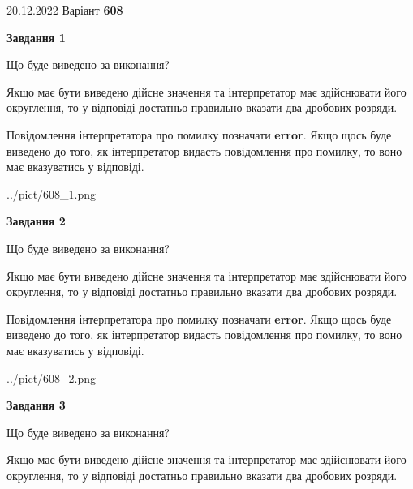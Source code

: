 \documentclass[12pt, ukrainian]{article}
\begin{document}
{20.12.2022 Варіант \No \textbf { 608 }\par}
{
\begin {Large}

{\begin {center}\textbf{Завдання 1}\end {center}}\par
Що буде виведено за виконання? \par

Якщо має бути виведено дійсне значення та інтерпретатор має здійснювати його округлення, 
то у відповіді достатньо правильно вказати два дробових розряди.

Повідомлення інтерпретатора про помилку позначати \textbf{error}.
Якщо щось буде виведено до того, як інтерпретатор видасть повідомлення про помилку, 
то воно має вказуватись у відповіді. \par

\begin{center}
	{../pict/608_1.png}
\end{center}
\newpage

{\begin {center}\textbf{Завдання 2}\end {center}}\par
Що буде виведено за виконання? \par

Якщо має бути виведено дійсне значення та інтерпретатор має здійснювати його округлення, 
то у відповіді достатньо правильно вказати два дробових розряди.

Повідомлення інтерпретатора про помилку позначати \textbf{error}.
Якщо щось буде виведено до того, як інтерпретатор видасть повідомлення про помилку, 
то воно має вказуватись у відповіді. \par

\begin{center}
	{../pict/608_2.png}
\end{center}
\newpage

{\begin {center}\textbf{Завдання 3}\end {center}}\par
Що буде виведено за виконання? \par

Якщо має бути виведено дійсне значення та інтерпретатор має здійснювати його округлення, 
то у відповіді достатньо правильно вказати два дробових розряди.


\end{Large}}
\end{document}
